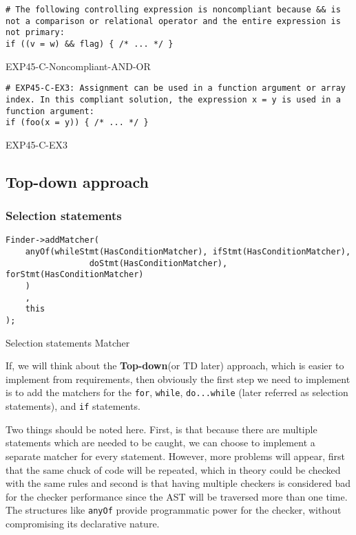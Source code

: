 \begin{listing}[H]
\begin{verbatim}
# The following controlling expression is noncompliant because && is not a comparison or relational operator and the entire expression is not primary:
if ((v = w) && flag) { /* ... */ }
\end{verbatim}
\caption{EXP45-C-Noncompliant-AND-OR}
\end{listing}

\begin{listing}[H]
\begin{verbatim}
# EXP45-C-EX3: Assignment can be used in a function argument or array index. In this compliant solution, the expression x = y is used in a function argument:
if (foo(x = y)) { /* ... */ }
\end{verbatim}
\caption{EXP45-C-EX3}
\end{listing}


\subsection{Top-down approach}

\subsubsection{Selection statements}
\begin{listing}[H]
\begin{verbatim}
Finder->addMatcher(
    anyOf(whileStmt(HasConditionMatcher), ifStmt(HasConditionMatcher),
                 doStmt(HasConditionMatcher), forStmt(HasConditionMatcher)
    )
    ,
    this
);
\end{verbatim}
\caption{Selection statements Matcher}
\end{listing}

If, we will think about the \textbf{Top-down}(or TD later) approach, which is easier to implement from requirements, then obviously the first step we need to implement is to add the matchers for the \lstinline{for}, \lstinline{while}, \lstinline{do...while} (later referred as selection statements), and \lstinline{if} statements. 

Two things should be noted here. First, is that because there are multiple statements which are needed to be caught, we can choose to implement a separate matcher for every statement. However, more problems will appear, first that the same chuck of code will be repeated, which in theory could be checked with the same rules and second is that having multiple checkers is considered bad for the checker performance since the AST will be traversed more than one time. The structures like \lstinline{anyOf} provide programmatic power for the checker, without compromising its declarative nature.    

